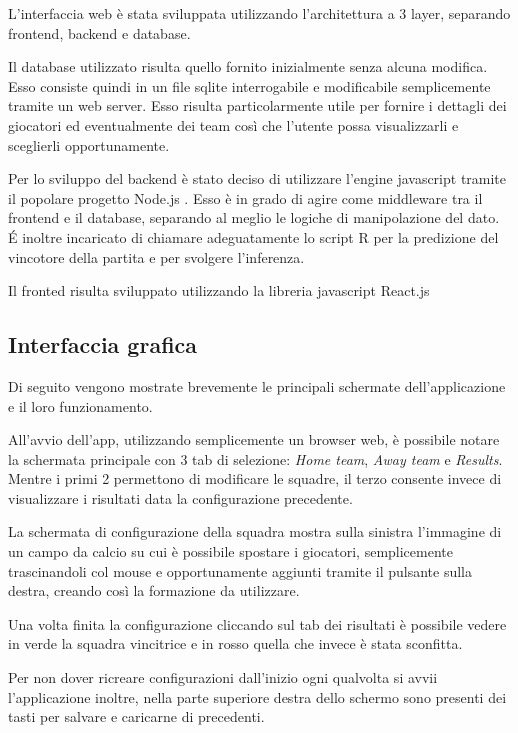 \documentclass[hidelinks, 12pt]{article}
\begin{document}
	L'interfaccia web è stata sviluppata utilizzando l'architettura a 3 layer, separando frontend, backend e database.
	
	Il database utilizzato risulta quello fornito inizialmente senza alcuna modifica. Esso consiste quindi in un file sqlite interrogabile e modificabile semplicemente tramite un web server. Esso risulta particolarmente utile per fornire i dettagli dei giocatori ed eventualmente dei team così che l'utente possa visualizzarli e sceglierli opportunamente.
	
	Per lo sviluppo del backend è stato deciso di utilizzare l'engine javascript tramite il popolare progetto Node.js \cite{site:nodejs}. Esso è in grado di agire come middleware tra il frontend e il database, separando al meglio le logiche di manipolazione del dato. \'E inoltre incaricato di chiamare adeguatamente lo script R per la predizione del vincotore della partita e per svolgere l'inferenza.
	
	Il fronted risulta sviluppato utilizzando la libreria javascript React.js \cite{site:react}
	
	\subsection{Interfaccia grafica}
	
	Di seguito vengono mostrate brevemente le principali schermate dell'applicazione e il loro funzionamento.
	
	All'avvio dell'app, utilizzando semplicemente un browser web, è possibile notare la schermata principale con 3 tab di selezione: {\it Home team}, {\it Away team} e {\it Results}. Mentre i primi 2 permettono di modificare le squadre, il terzo consente invece di visualizzare i risultati data la configurazione precedente.
	
	
	La schermata di configurazione della squadra mostra sulla sinistra l'immagine di un campo da calcio su cui è possibile spostare i giocatori, semplicemente trascinandoli col mouse e opportunamente aggiunti tramite il pulsante sulla destra, creando così la formazione da utilizzare.
	
	
	Una volta finita la configurazione cliccando sul tab dei risultati è possibile vedere in verde la squadra vincitrice e in rosso quella che invece è stata sconfitta.
	
	
	Per non dover ricreare configurazioni dall'inizio ogni qualvolta si avvii l'applicazione inoltre, nella parte superiore destra dello schermo sono presenti dei tasti per salvare e caricarne di precedenti.
	
\end{document}
